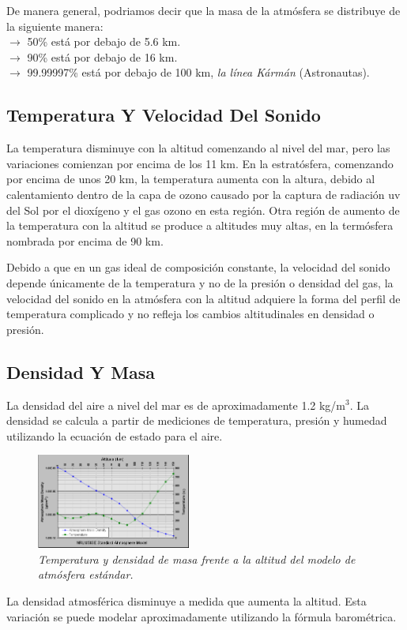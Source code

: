 \documentclass[12pt]{article}
\begin{document}
De manera general, podriamos decir que la masa de la atmósfera se distribuye de la siguiente manera:\\
$\to$ 50\% está por debajo de 5.6 km.\\
$\to$ 90\% está por debajo de 16 km.\\
$\to$ 99.99997\% está por debajo de 100 km, \textit{la línea Kármán} (Astronautas).


\subsection{Temperatura Y Velocidad Del Sonido}
La temperatura disminuye con la altitud comenzando al nivel del mar, pero las variaciones comienzan por encima de los 11 km. En la estratósfera, comenzando por encima de unos 20 km, la temperatura aumenta con la altura, debido al calentamiento dentro de la capa de ozono causado por la captura de radiación uv del Sol por el dioxígeno y el gas ozono en esta región. Otra región de aumento de la temperatura con la altitud se produce a altitudes muy altas, en la termósfera  nombrada por encima de 90 km.

Debido a que en un gas ideal de composición constante, la velocidad del sonido depende únicamente de la temperatura y no de la presión o densidad del gas, la velocidad del sonido en la atmósfera con la altitud adquiere la forma del perfil de temperatura complicado y no refleja los cambios altitudinales en densidad o presión.

\subsection{Densidad Y Masa}
La densidad del aire a nivel del mar es de aproximadamente 1.2 kg/m$^3$. La densidad se calcula a partir de mediciones de temperatura, presión y humedad utilizando la ecuación de estado para el aire.\\
\begin{figure} 
\includegraphics[width=0.45\textwidth]{model.png}
\caption{\textit{Temperatura y densidad de masa frente a la altitud del modelo de atmósfera estándar.}}
\end{figure}La densidad atmosférica disminuye a medida que aumenta la altitud. Esta variación se puede modelar aproximadamente utilizando la fórmula barométrica.
\end{document}
